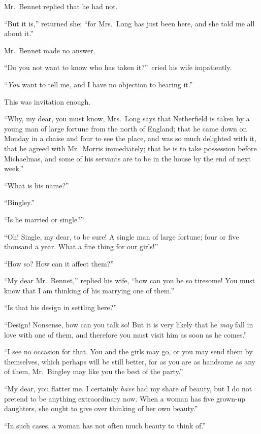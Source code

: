\documentclass[12pt,english,oneside]{book}
\begin{document}
Mr.\ Bennet replied that he had not.

{}``But it is,'' returned she; {}``for Mrs.\ Long has just been
here, and she told me all about it.''

Mr.\ Bennet made no answer.

{}``Do you not want to know who has taken it?''\ cried his wife
impatiently.

{}``\textit{You} want to tell me, and I have no objection to hearing
it.''

This was invitation enough.

{}``Why, my dear, you must know, Mrs.\ Long says that Netherfield
is taken by a young man of large fortune from the north of England;
that he came down on Monday in a chaise and four to see the place,
and was so much delighted with it, that he agreed with Mr.\ Morris
immediately; that he is to take possession before Michaelmas, and
some of his servants are to be in the house by the end of next week.''

{}``What is his name?''\ 

{}``Bingley.''

{}``Is he married or single?''\ 

{}``Oh! Single, my dear, to be sure! A single man of large fortune;
four or five thousand a year. What a fine thing for our girls!''\ 

{}``How so? How can it affect them?''\ 

{}``My dear Mr.\ Bennet,'' replied his wife, {}``how can you be
so tiresome! You must know that I am thinking of his marrying one
of them.''

{}``Is that his design in settling here?''\ 

{}``Design! Nonsense, how can you talk so! But it is very likely
that he \textit{may} fall in love with one of them, and therefore
you must visit him as soon as he comes.''

{}``I see no occasion for that. You and the girls may go, or you
may send them by themselves, which perhaps will be still better, for
as you are as handsome as any of them, Mr.\ Bingley may like you
the best of the party.''

{}``My dear, you flatter me. I certainly \textit{have} had my share
of beauty, but I do not pretend to be anything extraordinary now.
When a woman has five grown-up daughters, she ought to give over thinking
of her own beauty.''

{}``In such cases, a woman has not often much beauty to think of.''
\end{document}
